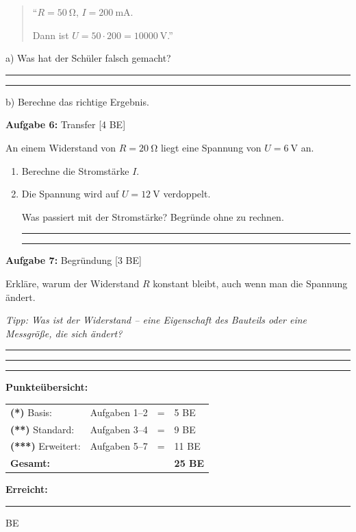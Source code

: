 \documentclass[11pt, a4paper]{article}
\newcommand{\luecke}[1]{\rule{#1}{0.4pt}}
\newcommand{\antwort}[1]{\vspace{#1}\hrule\vspace{2pt}}
\newcommand{\niveauEins}{\textcolor{stern1}{\textbf{(*)}}}
\newcommand{\niveauZwei}{\textcolor{stern2}{\textbf{(**)}}}
\newcommand{\niveauDrei}{\textcolor{stern3}{\textbf{(***)}}}
\newcommand{\punkte}[1]{\hfill\textcolor{grau}{\small[#1 BE]}}
\begin{document}
\begin{quote}
``$R = \SI{50}{\ohm}$, $I = \SI{200}{\milli\ampere}$.

Dann ist $U = 50 \cdot 200 = \SI{10000}{\volt}$.''
\end{quote}

a) Was hat der Schüler falsch gemacht?

\antwort{1.5cm}
\antwort{1.5cm}

\vspace{0.5em}

b) Berechne das richtige Ergebnis.

\vspace{2cm}

\vspace{1em}

\textbf{Aufgabe 6:} Transfer \punkte{4}

An einem Widerstand von $R = \SI{20}{\ohm}$ liegt eine Spannung von $U = \SI{6}{\volt}$ an.

\begin{enumerate}[label=\alph*)]
    \item Berechne die Stromstärke $I$.

    \vspace{2cm}

    \item Die Spannung wird auf $U = \SI{12}{\volt}$ verdoppelt.

    Was passiert mit der Stromstärke? Begründe ohne zu rechnen.

    \antwort{1.5cm}
    \antwort{1.5cm}
\end{enumerate}

\vspace{1em}

\textbf{Aufgabe 7:} Begründung \punkte{3}

Erkläre, warum der Widerstand $R$ konstant bleibt, auch wenn man die Spannung ändert.

\textit{Tipp: Was ist der Widerstand -- eine Eigenschaft des Bauteils oder eine Messgröße, die sich ändert?}

\antwort{1.5cm}
\antwort{1.5cm}
\antwort{1.5cm}

\vspace{1.5em}


\begin{tcolorbox}[colback=hellgrau, colframe=grau, boxrule=0.5pt, arc=0pt]
\small
\textbf{Punkteübersicht:}

\begin{tabular}{llcl}
\niveauEins{} Basis: & Aufgaben 1--2 & = & 5 BE \\
\niveauZwei{} Standard: & Aufgaben 3--4 & = & 9 BE \\
\niveauDrei{} Erweitert: & Aufgaben 5--7 & = & 11 BE \\
\hline
\textbf{Gesamt:} & & & \textbf{25 BE}
\end{tabular}
\hfill
\textbf{Erreicht:} \luecke{1.5cm} BE
\end{tcolorbox}
\end{document}
